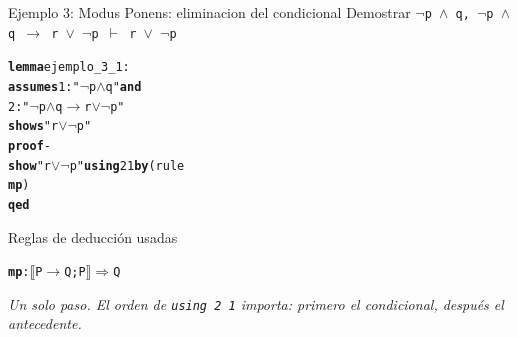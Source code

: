\documentclass[11pt,aspectratio=169]{beamer}
\newcommand{\sAnd}{\(\wedge\)}
\newcommand{\sOr}{\(\vee\)}
\newcommand{\sNot}{\(\neg\)}
\newcommand{\sImp}{\(\longrightarrow\)}
\newcommand{\sMeta}{\(\Longrightarrow\)}
\newcommand{\sTurn}{\(\vdash\)}
\newcommand{\sLb}{\(\llbracket\)}
\newcommand{\sRb}{\(\rrbracket\)}
\newcommand{\kw}[1]{\textcolor{isaCmd}{\textbf{#1}}}
\newcommand{\str}[1]{\textcolor{isaStr}{#1}}
\newcommand{\Rn}[1]{\textcolor{granate}{\textbf{#1}}}
\newcommand{\R}[1]{{\setlength{\fboxsep}{1pt}%
  \colorbox{resalte}{\ttfamily\bfseries\textcolor{granate}{#1}}}}
\newcommand{\nota}[1]{{\small\itshape\color{gray} #1}}
\begin{document}
\begin{frame}[fragile]{Ejemplo 3: Modus Ponens: eliminacion del condicional}
  Demostrar \quad
  \texttt{\sNot p \sAnd{} q,\; \sNot p \sAnd{} q \sImp{} r \sOr{} \sNot p
  \;\sTurn{}\; r \sOr{} \sNot p}
  \vspace{0.5em}
  \pause
\begin{alltt}\footnotesize
\kw{lemma} ejemplo_3_1:
  \kw{assumes} 1: \str{"\sNot p \sAnd{} q"} \kw{and}
          2: \str{"\sNot p \sAnd{} q \sImp{} r \sOr{} \sNot p"}
  \kw{shows}      \str{"r \sOr{} \sNot p"}
\kw{proof} -
  \kw{show} \str{"r \sOr{} \sNot p"} \kw{using} 2 1 \kw{by} (rule \R{mp})
\kw{qed}
\end{alltt}
  \pause
  \begin{block}{Reglas de deducción usadas}
\begin{alltt}\footnotesize
\Rn{mp}: \sLb{}P \sImp{} Q; P\sRb{} \sMeta{} Q
\end{alltt}
\end{block}
  \pause
  \vspace{0.2em}
  \nota{Un solo paso. El orden de \texttt{using 2 1} importa: primero el
  condicional, después el antecedente.}
\end{frame}
\end{document}
